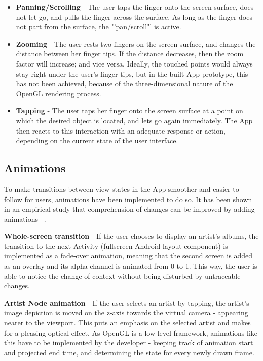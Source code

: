 \begin{itemize}
	\item \textbf{Panning/Scrolling} - The user taps the finger onto the screen surface, does not let 
	go, and pulls the finger across the surface. As long as the finger does not part from the surface, 
	the "'pan/scroll"' is active.
	\item \textbf{Zooming} - The user rests two fingers on the screen surface, and changes the distance
	between her finger tips. If the distance decreases, then the zoom factor will increase; and vice versa.
	Ideally, the touched points would always stay right under the user's finger tips, but in the built
	App prototype, this has not been achieved, because of the three-dimensional nature of the OpenGL
	rendering process.
	\item \textbf{Tapping} - The user taps her finger onto the screen surface at a point on which the
	desired object is located, and lets go again immediately. The App then reacts to this interaction
	with an adequate response or action, depending on the current state of the user interface.
\end{itemize}

\subsection{Animations}

To make transitions between view states in the App smoother and easier to follow for users, animations have been implemented to do so. It has been shown in an empirical study that comprehension of changes can be improved by adding animations ~\cite{Schlienger:2007}.

\textbf{Whole-screen transition} - If the user chooses to display an artist's albums, the transition to the next Activity (fullscreen Android layout component) is implemented as a fade-over animation, meaning that the second screen is added as an overlay and its alpha channel is animated from 0 to 1. This way, the user is able to notice the change of context without being disturbed by untraceable changes.

\textbf{Artist Node animation} - If the user selects an artist by tapping, the artist's image depiction is moved on the z-axis towards the virtual camera - appearing nearer to the viewport. This puts an emphasis on the selected artist and makes for a pleasing optical effect. As OpenGL is a low-level framework, animations like this have to be implemented by the developer - keeping track of animation start and projected end time, and determining the state for every newly drawn frame.

